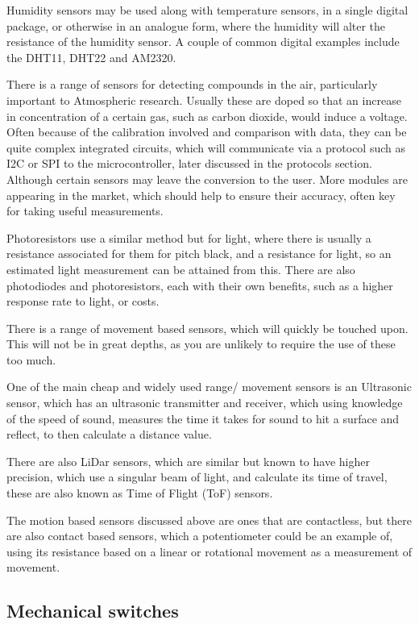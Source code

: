 \documentclass[a4paper,11pt]{report}
\begin{document}
Humidity sensors may be used along with temperature sensors, in a single digital package, or otherwise in an analogue form, where the humidity will alter the resistance of the humidity sensor. A couple of common digital examples include the DHT11, DHT22 and AM2320.


There is a range of sensors for detecting compounds in the air, particularly important to Atmospheric research. Usually these are doped so that an increase in concentration of a certain gas, such as carbon dioxide, would induce a voltage. Often because of the calibration involved and comparison with data, they can be quite complex integrated circuits, which will communicate via a protocol such as I2C or SPI to the microcontroller, later discussed in the protocols section. Although certain sensors may leave the conversion to the user. More modules are appearing in the market, which should help to ensure their accuracy, often key for taking useful measurements.


Photoresistors use a similar method but for light, where there is usually a resistance associated for them for pitch black, and a resistance for light, so an estimated light measurement can be attained from this. There are also photodiodes and photoresistors, each with their own benefits, such as a higher response rate to light, or costs.


There is a range of movement based sensors, which will quickly be touched upon. This will not be in great depths, as you are unlikely to require the use of these too much.

One of the main cheap and widely used range/ movement sensors is an Ultrasonic sensor, which has an ultrasonic transmitter and receiver, which using knowledge of the speed of sound, measures the time it takes for sound to hit a surface and reflect, to then calculate a distance value.

There are also LiDar sensors, which are similar but known to have higher precision, which use a singular beam of light, and calculate its time of travel, these are also known as Time of Flight (ToF) sensors.

The motion based sensors discussed above are ones that are contactless, but there are also contact based sensors, which a potentiometer could be an example of, using its resistance based on a linear or rotational movement as a measurement of movement.

\subsection{Mechanical switches}
\end{document}
